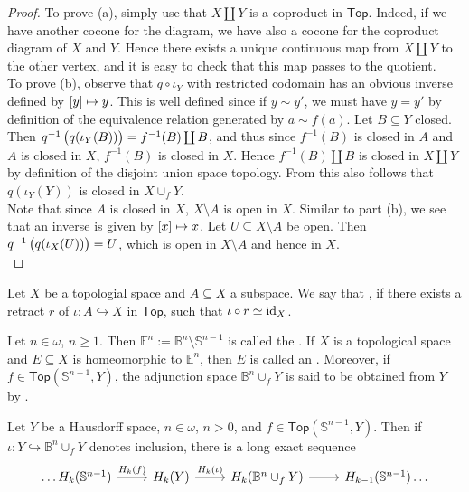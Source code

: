 \begin{proof}
	To prove (a), simply use that $X \coprod Y$ is a coproduct in $\mathsf{Top}$. Indeed, if we have another cocone for the diagram, we have also a cocone for the coproduct diagram of $X$ and $Y$. Hence there exists a unique continuous map from $X \coprod Y$ to the other vertex, and it is easy to check that this map passes to the quotient.\\
	To prove (b), observe that $q \circ \iota_Y$ with restricted codomain has an obvious inverse defined by $\sbr[0]{y} \mapsto y$. This is well defined since if $y {\sim}y'$, we must have $y = y'$ by definition of the equivalence relation generated by $a{\sim}f(a)$. Let $B \subseteq Y$ closed. Then $q^{-1}\del[1]{q(\iota_Y(B))} = f^{-1}(B) \coprod B$, and thus since $f^{-1}(B)$ is closed in $A$ and $A$ is closed in $X$, $f^{-1}(B)$ is closed in $X$. Hence $f^{-1}(B) \coprod B$ is closed in $X \coprod Y$ by definition of the disjoint union space topology. From this also follows that $q(\iota_Y(Y))$ is closed in $X \cup_f Y$.\\
	Note that since $A$ is closed in $X$, $X \setminus A$ is open in $X$. Similar to part (b), we see that an inverse is given by $\sbr{x} \mapsto x$. Let $U \subseteq X \setminus A$ be open. Then $q^{-1}\del[1]{q(\iota_X(U))} = U$, which is open in $X \setminus A$ and hence in $X$.\\
	
\end{proof}

\begin{definition}
	Let $X$ be a topologial space and $A \subseteq X$ a subspace. We say that , if there exists a retract $r$ of $\iota : A \hookrightarrow X$ in $\mathsf{Top}$, such that $\iota \circ r \simeq \operatorname{id}_X$.
\end{definition}

\begin{definition}[Cells]
	Let $n \in \omega$, $n \geq 1$. Then $\mathbb{E}^n := \mathbb{B}^n \setminus \mathbb{S}^{n-1}$ is called the . If $X$ is a topological space and $E \subseteq X$ is homeomorphic to $\mathbb{E}^n$, then $E$ is called an . Moreover, if $f \in \mathsf{Top}(\mathbb{S}^{n-1},Y)$, the adjunction space $\mathbb{B}^n \cup_f Y$ is said to be obtained from $Y$ by . 
\end{definition}

\begin{proposition}
	Let $Y$ be a Hausdorff space, $n \in \omega$, $n > 0$, and $f \in \mathsf{Top}(\mathbb{S}^{n - 1},Y)$. Then if $\iota : Y \hookrightarrow  \mathbb{B}^n \cup_f Y$ denotes inclusion, there is a long exact sequence
	\begin{equation*}
		\begin{tikzcd}
			\dots H_k(\mathbb{S}^{n - 1}) \arrow[r,"H_k(f)"] & H_k(Y) \arrow[r,"H_k(\iota)"] & H_k(\mathbb{B}^n \cup_f Y) \arrow[r] & H_{k - 1}(\mathbb{S}^{n - 1}) \dots
		\end{tikzcd}
	\end{equation*}
\end{proposition}

